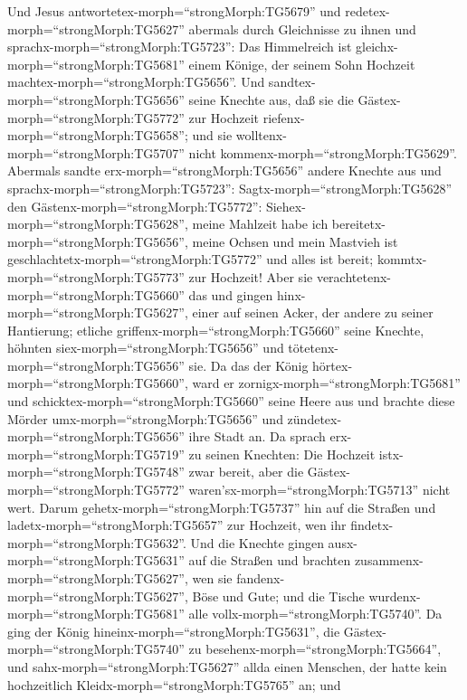  Und Jesus antwortetex-morph=``strongMorph:TG5679'' und
redetex-morph=``strongMorph:TG5627'' abermals durch Gleichnisse zu ihnen
und sprachx-morph=``strongMorph:TG5723'':  Das Himmelreich
ist gleichx-morph=``strongMorph:TG5681'' einem Könige, der seinem Sohn
Hochzeit machtex-morph=``strongMorph:TG5656''.  Und
sandtex-morph=``strongMorph:TG5656'' seine Knechte aus, daß sie die
Gästex-morph=``strongMorph:TG5772'' zur Hochzeit
riefenx-morph=``strongMorph:TG5658''; und sie
wolltenx-morph=``strongMorph:TG5707'' nicht
kommenx-morph=``strongMorph:TG5629''.  Abermals sandte
erx-morph=``strongMorph:TG5656'' andere Knechte aus und
sprachx-morph=``strongMorph:TG5723'': Sagtx-morph=``strongMorph:TG5628''
den Gästenx-morph=``strongMorph:TG5772'':
Siehex-morph=``strongMorph:TG5628'', meine Mahlzeit habe ich
bereitetx-morph=``strongMorph:TG5656'', meine Ochsen und mein Mastvieh
ist geschlachtetx-morph=``strongMorph:TG5772'' und alles ist bereit;
kommtx-morph=``strongMorph:TG5773'' zur Hochzeit!  Aber sie
verachtetenx-morph=``strongMorph:TG5660'' das und gingen
hinx-morph=``strongMorph:TG5627'', einer auf seinen Acker, der andere zu
seiner Hantierung;  etliche
griffenx-morph=``strongMorph:TG5660'' seine Knechte, höhnten
siex-morph=``strongMorph:TG5656'' und
tötetenx-morph=``strongMorph:TG5656'' sie.  Da das der König
hörtex-morph=``strongMorph:TG5660'', ward er
zornigx-morph=``strongMorph:TG5681'' und
schicktex-morph=``strongMorph:TG5660'' seine Heere aus und brachte diese
Mörder umx-morph=``strongMorph:TG5656'' und
zündetex-morph=``strongMorph:TG5656'' ihre Stadt an.  Da
sprach erx-morph=``strongMorph:TG5719'' zu seinen Knechten: Die Hochzeit
istx-morph=``strongMorph:TG5748'' zwar bereit, aber die
Gästex-morph=``strongMorph:TG5772''
waren'sx-morph=``strongMorph:TG5713'' nicht wert.  Darum
gehetx-morph=``strongMorph:TG5737'' hin auf die Straßen und
ladetx-morph=``strongMorph:TG5657'' zur Hochzeit, wen ihr
findetx-morph=``strongMorph:TG5632''.  Und die Knechte
gingen ausx-morph=``strongMorph:TG5631'' auf die Straßen und brachten
zusammenx-morph=``strongMorph:TG5627'', wen sie
fandenx-morph=``strongMorph:TG5627'', Böse und Gute; und die Tische
wurdenx-morph=``strongMorph:TG5681'' alle
vollx-morph=``strongMorph:TG5740''.  Da ging der König
hineinx-morph=``strongMorph:TG5631'', die
Gästex-morph=``strongMorph:TG5740'' zu
besehenx-morph=``strongMorph:TG5664'', und
sahx-morph=``strongMorph:TG5627'' allda einen Menschen, der hatte kein
hochzeitlich Kleidx-morph=``strongMorph:TG5765'' an;  und
